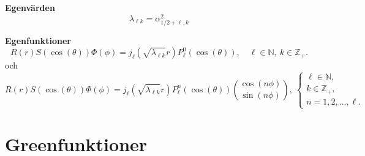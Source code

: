 \documentclass{article}
\begin{document}
\textbf{Egenvärden}
\begin{equation}
    \lambda_{\ell k}=\alpha_{1/2+\ell,k}^2
\end{equation}

\textbf{Egenfunktioner}
\begin{equation}
    R(r)S(\cos(\theta))\Phi(\phi)=j_{\ell}(\sqrt{\lambda_{\ell k}}r)P_{\ell}^0(\cos(\theta)), \quad \ell\in\mathbb{N}, \ k\in\mathbb{Z}_+.
\end{equation}
och
\begin{equation}
    R(r)S(\cos(\theta))\Phi(\phi)=j_{\ell}(\sqrt{\lambda_{\ell k}}r)P_{\ell}^n(\cos(\theta)){\cos(n\phi) \choose \sin(n\phi)}, \ 
    \begin{cases}
    \ell\in\mathbb{N},\\
    k\in\mathbb{Z}_+,\\ 
    n=1,2,...,\ell.
    \end{cases}
\end{equation}
\newpage
\section{Greenfunktioner}
\end{document}
